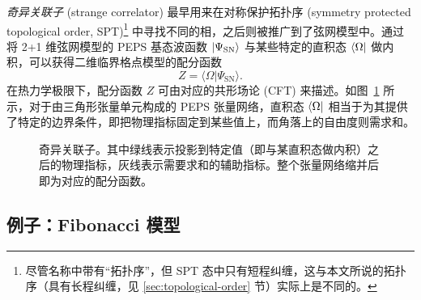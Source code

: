\emph{奇异关联子} (strange correlator) 最早用来在对称保护拓扑序 (symmetry protected topological order, SPT)\footnote{尽管名称中带有“拓扑序”，但 SPT 态中只有短程纠缠，这与本文所说的拓扑序（具有长程纠缠，见 \ref{sec:topological-order} 节）实际上是不同的。} 中寻找不同的相\cite{you2014wave}，之后则被推广到了弦网模型中\cite{vanhove2018mapping,lootens2019cardy,vanhove2022topological}。通过将 2+1 维弦网模型的 PEPS 基态波函数 $\ket{\Psi_\text{SN}}$ 与某些特定的直积态 $\bra{\Omega}$ 做内积，可以获得二维临界格点模型的配分函数
\begin{equation}
  Z = \langle\Omega|\Psi_\text{SN}\rangle.
\end{equation}
在热力学极限下，配分函数 $Z$ 可由对应的共形场论 (CFT) 来描述。如图~\ref{fig:peps-strange-correlator} 所示，对于由三角形张量单元构成的 PEPS 张量网络，直积态 $\bra{\Omega}$ 相当于为其提供了特定的边界条件，即把物理指标固定到某些值上，而角落上的自由度则需求和。

\begin{figure}[htb]
  \centering
  \caption[奇异关联子]{奇异关联子。其中绿线表示投影到特定值（即与某直积态做内积）之后的物理指标，灰线表示需要求和的辅助指标。整个张量网络缩并后即为对应的配分函数。}
  \label{fig:peps-strange-correlator}
\end{figure}

\subsection{例子：Fibonacci 模型}
\label{subsec:strange-correlator-fib}

